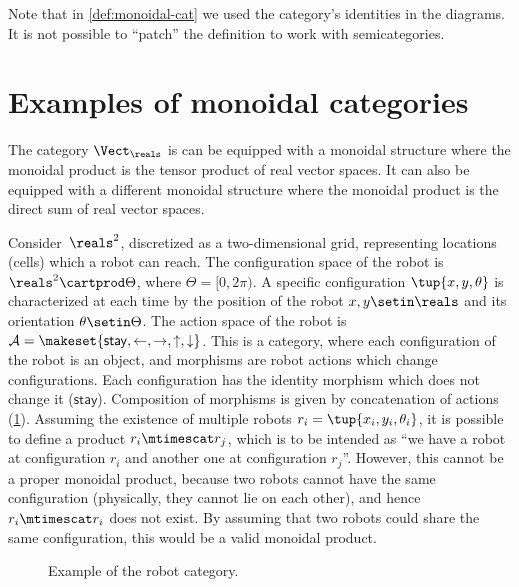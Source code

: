 \begin{remark}
    Note that in \cref{def:monoidal-cat} we used the category's identities in the diagrams.
    It is not possible to ``patch'' the definition to work with semicategories.
\end{remark}

\section{Examples of monoidal categories}



\begin{example}
    \label{ex:Vect-symmetric-monoidal}
    The category $\Vect_\reals$ is can be equipped with a monoidal structure where the monoidal product is the tensor product of real vector spaces.
    It can also be equipped with a different monoidal structure where the monoidal product is the direct sum of real vector spaces.
\end{example}

\begin{example}
    \label{ex:robot}
    Consider~$\reals^2$, discretized as a two-dim\-ensional grid, representing locations (cells) which a robot can reach.
    The configuration space of the robot is $\reals^2\cartprod \Theta$, where $\Theta=[0,2\pi)$.
    A specific configuration $\tup{x,y,\theta}$ is characterized at each time by the position of the robot $x,y\setin \reals$ and its orientation $\theta \setin \Theta$.
    The action space of the robot is $\mathcal{A}=\makeset{\mathsf{stay},\leftarrow, \rightarrow, \uparrow, \downarrow}$.
    This is a category, where each configuration of the robot is an object, and morphisms are robot actions which change configurations.
    Each configuration has the identity morphism which does not change it ($\mathsf{stay}$).
    Composition of morphisms is given by concatenation of actions (\cref{fig:robotcategory}).
    Assuming the existence of multiple robots $r_i=\tup{x_i,y_i,\theta_i}$, it is possible to define a product $r_i\mtimescat r_j$, which is to be intended as ``we have a robot at configuration $r_i$ and another one at configuration $r_j$''.
    However, this cannot be a proper monoidal product, because two robots cannot have the same configuration (physically, they cannot lie on each other), and hence $r_i\mtimescat r_i$ does not exist.
    By assuming that two robots could share the same configuration, this would be a valid monoidal product.
    \begin{figure}[tbh]
        \centering
        \caption{Example of the robot category. }
        \label{fig:robotcategory}
    \end{figure}
\end{example}

